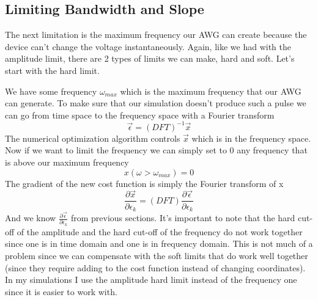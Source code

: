 

\subsection{Limiting Bandwidth and Slope}
The next limitation is the maximum frequency our AWG can create because the device can't change the voltage instantaneously. Again, like we had with the amplitude limit, there are 2 types of limits we can make, hard and soft. Let's start with the hard limit.

We have some frequency $ \omega_{max} $ which is the maximum frequency that our AWG can generate. To make sure that our simulation doesn't produce such a pulse we can go from time space to the frequency space with a Fourier transform
\[
    \vec{\epsilon} = (DFT)^{-1} \vec{x}
\]
The numerical optimization algorithm controls $\vec{x}$ which is in the frequency space. Now if we want to limit the frequency we can simply set to 0 any frequency that is above our maximum frequency
\[
    x (\omega > \omega_{max}) = 0
\]
The gradient of the new cost function is simply the Fourier transform of x
\[
    \frac{\partial \vec{x}}{\partial \epsilon_k} = (DFT) \frac{\partial \vec{\epsilon}}{\partial \epsilon_k}
\]
And we know $\frac{\partial \vec{\epsilon}}{\partial \epsilon_k}$ from previous sections.
It's important to note that the hard cut-off of the amplitude and the hard cut-off of the frequency do not work together since one is in time domain and one is in frequency domain. This is not much of a problem since we can compensate with the soft limits that do work well together (since they require adding to the cost function instead of changing coordinates). In my simulations I use the amplitude hard limit instead of the frequency one since it is easier to work with.

